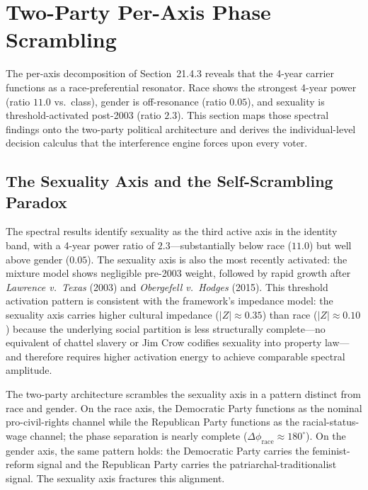 
\section{Two-Party Per-Axis Phase Scrambling}
\label{sec:two_party_phase}

The per-axis decomposition of Section~21.4.3 reveals that the 4-year carrier functions as a race-preferential resonator. Race shows the strongest 4-year power (ratio $11.0$ vs.\ class), gender is off-resonance (ratio $0.05$), and sexuality is threshold-activated post-2003 (ratio $2.3$). This section maps those spectral findings onto the two-party political architecture and derives the individual-level decision calculus that the interference engine forces upon every voter.

\subsection{The Sexuality Axis and the Self-Scrambling Paradox}
\label{sec:self_scrambling}

The spectral results identify sexuality as the third active axis in the identity band, with a 4-year power ratio of $2.3$---substantially below race ($11.0$) but well above gender ($0.05$). The sexuality axis is also the most recently activated: the mixture model shows negligible pre-2003 weight, followed by rapid growth after \textit{Lawrence v.\ Texas} (2003) and \textit{Obergefell v.\ Hodges} (2015). This threshold activation pattern is consistent with the framework's impedance model: the sexuality axis carries higher cultural impedance ($|Z| \approx 0.35$) than race ($|Z| \approx 0.10$) because the underlying social partition is less structurally complete---no equivalent of chattel slavery or Jim Crow codifies sexuality into property law---and therefore requires higher activation energy to achieve comparable spectral amplitude.

The two-party architecture scrambles the sexuality axis in a pattern distinct from race and gender. On the race axis, the Democratic Party functions as the nominal pro-civil-rights channel while the Republican Party functions as the racial-status-wage channel; the phase separation is nearly complete ($\Delta\phi_{\text{race}} \approx 180^{\circ}$). On the gender axis, the same pattern holds: the Democratic Party carries the feminist-reform signal and the Republican Party carries the patriarchal-traditionalist signal. The sexuality axis fractures this alignment.

